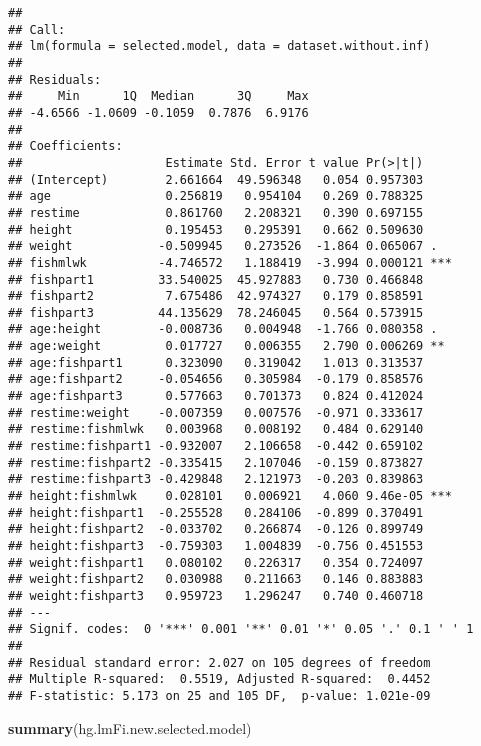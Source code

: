 \documentclass[12pt,]{article}
\newenvironment{Shaded}{\begin{snugshade}}{\end{snugshade}}
\newcommand{\KeywordTok}[1]{\textcolor[rgb]{0.13,0.29,0.53}{\textbf{#1}}}
\newcommand{\NormalTok}[1]{#1}
\begin{document}
\begin{verbatim}
## 
## Call:
## lm(formula = selected.model, data = dataset.without.inf)
## 
## Residuals:
##     Min      1Q  Median      3Q     Max 
## -4.6566 -1.0609 -0.1059  0.7876  6.9176 
## 
## Coefficients:
##                    Estimate Std. Error t value Pr(>|t|)    
## (Intercept)        2.661664  49.596348   0.054 0.957303    
## age                0.256819   0.954104   0.269 0.788325    
## restime            0.861760   2.208321   0.390 0.697155    
## height             0.195453   0.295391   0.662 0.509630    
## weight            -0.509945   0.273526  -1.864 0.065067 .  
## fishmlwk          -4.746572   1.188419  -3.994 0.000121 ***
## fishpart1         33.540025  45.927883   0.730 0.466848    
## fishpart2          7.675486  42.974327   0.179 0.858591    
## fishpart3         44.135629  78.246045   0.564 0.573915    
## age:height        -0.008736   0.004948  -1.766 0.080358 .  
## age:weight         0.017727   0.006355   2.790 0.006269 ** 
## age:fishpart1      0.323090   0.319042   1.013 0.313537    
## age:fishpart2     -0.054656   0.305984  -0.179 0.858576    
## age:fishpart3      0.577663   0.701373   0.824 0.412024    
## restime:weight    -0.007359   0.007576  -0.971 0.333617    
## restime:fishmlwk   0.003968   0.008192   0.484 0.629140    
## restime:fishpart1 -0.932007   2.106658  -0.442 0.659102    
## restime:fishpart2 -0.335415   2.107046  -0.159 0.873827    
## restime:fishpart3 -0.429848   2.121973  -0.203 0.839863    
## height:fishmlwk    0.028101   0.006921   4.060 9.46e-05 ***
## height:fishpart1  -0.255528   0.284106  -0.899 0.370491    
## height:fishpart2  -0.033702   0.266874  -0.126 0.899749    
## height:fishpart3  -0.759303   1.004839  -0.756 0.451553    
## weight:fishpart1   0.080102   0.226317   0.354 0.724097    
## weight:fishpart2   0.030988   0.211663   0.146 0.883883    
## weight:fishpart3   0.959723   1.296247   0.740 0.460718    
## ---
## Signif. codes:  0 '***' 0.001 '**' 0.01 '*' 0.05 '.' 0.1 ' ' 1
## 
## Residual standard error: 2.027 on 105 degrees of freedom
## Multiple R-squared:  0.5519, Adjusted R-squared:  0.4452 
## F-statistic: 5.173 on 25 and 105 DF,  p-value: 1.021e-09
\end{verbatim}

\begin{Shaded}
\begin{Highlighting}[]
\KeywordTok{summary}\NormalTok{(hg.lmFi.new.selected.model)}
\end{Highlighting}
\end{Shaded}
\end{document}
